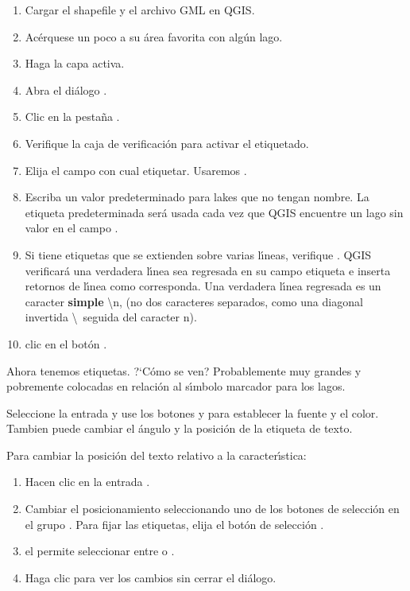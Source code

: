 \begin{enumerate}
\item Cargar el shapefile  y el archivo GML  en QGIS.
\item Ac\'erquese un poco a su \'area favorita con alg\'un lago.
\item Haga  la capa activa.
\item Abra el di\'alogo .
\item Clic en la pesta\~na .
\item Verifique la caja de verificaci\'on  para activar el etiquetado.
\item Elija el campo con cual etiquetar. 
  Usaremos .
\item Escriba un valor predeterminado para lakes que no tengan nombre. La etiqueta predeterminada ser\'a
  usada cada vez que QGIS encuentre un lago sin valor en el campo .
\item Si tiene etiquetas que se extienden sobre varias l\'{\i}neas, verifique . 
QGIS verificar\'a una verdadera l\'{\i}nea sea regresada en su campo etiqueta e inserta retornos de l\'{\i}nea como corresponda.
Una verdadera l\'{\i}nea regresada es un caracter \textbf{simple} \textbackslash n, 
(no dos caracteres separados, como una diagonal invertida \textbackslash ~seguida del caracter n).
\item clic en el bot\'on .
\end{enumerate} 

Ahora tenemos etiquetas. ?`C\'omo se ven? Probablemente muy grandes y pobremente colocadas en relaci\'on al s\'{\i}mbolo
marcador para los lagos.

Seleccione la entrada  y use los botones   y 
para establecer la fuente y el color. Tambien puede cambiar el \'angulo y la posici\'on de la etiqueta de texto.


Para cambiar la posici\'on del texto relativo a la caracter\'{\i}stica:

\begin{enumerate} 
\item Hacen clic en la entrada .
\item Cambiar el posicionamiento seleccionando uno de los botones de selecci\'on
en el grupo . Para fijar las etiquetas, elija el bot\'on de selecci\'on
.
\item el  permite seleccionar entre
 o .
\item Haga clic  para ver los cambios sin cerrar el di\'alogo.
\end{enumerate} 

